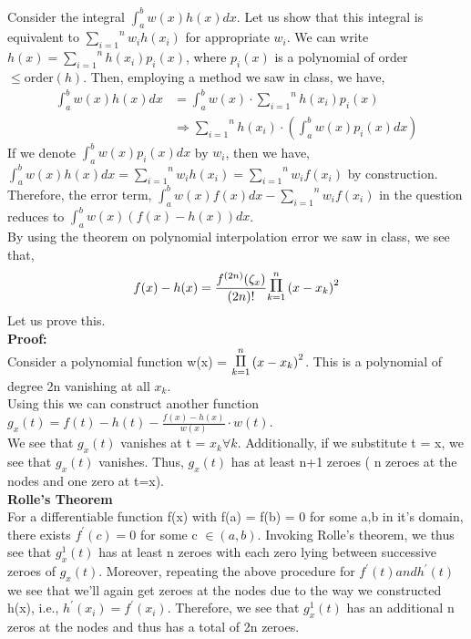 \documentclass[letterpaper]{exam}
\begin{document}
\begin{questions}
\begin{solution}
Consider the integral $\int_{a}^{b} w(x)h(x) dx$. Let us show that this integral is equivalent to $\overset{n}{\underset{i=1}{\sum}}w_ih(x_i)$ for appropriate $w_i$. We can write $h(x) = \overset{n}{\underset{i=1}{\sum}}h(x_i)p_i(x)$, where $p_i(x)$ is a polynomial of order $\leq \text{order}(h)$. Then, employing a method we saw in class, we have,
\begin{align*}
    \int_{a}^{b} w(x)h(x) dx &= \int_{a}^{b} w(x)\cdot \overset{n}{\underset{i=1}{\sum}}h(x_i)p_i(x)\\
    &\Rightarrow 
    \overset{n}{\underset{i=1}{\sum}}h(x_i)\cdot \left(\int_{a}^{b} w(x)p_i(x) dx\right) 
\end{align*}
If we denote $\int_{a}^{b} w(x)p_i(x) dx$ by $w_i$, then we have, $\int_{a}^{b} w(x)h(x) dx = \overset{n}{\underset{i=1}{\sum}}w_ih(x_i) = \overset{n}{\underset{i=1}{\sum}}w_if(x_i) $ by construction.
\\
Therefore, the error term, $\int_{a}^{b} w(x)f(x) dx - \overset{n}{\underset{i=1}{\sum}} w_if(x_i)$ in the question reduces to $\int_{a}^{b} w(x)\left(f(x) - h(x)\right) dx$.\\
By using the theorem on polynomial interpolation error we saw in class, we see that,
\begin{align}
    f(x) - h(x) = \frac{f^{(2n)}(\zeta_{x})}{(2n)!}\overset{n}{\underset{k = 1}{\mathlarger{\mathlarger{\Pi}}}}\left(x-x_k\right)^2
\end{align}
Let us prove this.
\\ \textbf{Proof:}\\
Consider a polynomial function w(x) = $\overset{n}{\underset{k = 1}{\mathlarger{\mathlarger{\Pi}}}}\left(x-x_k\right)^2$. This is a polynomial of degree 2n vanishing at all $x_k$.\\
Using this we can construct another function $g_x(t) = f(t) - h(t) - \frac{f(x)-h(x)}{w(x)}\cdot w(t)$.\\
We see that $g_x(t)$ vanishes at t = $x_k \forall k$. Additionally, if we substitute t = x, we see that $g_x(t)$ vanishes. Thus, $g_x(t)$ has at least n+1 zeroes ( n zeroes at the nodes and one zero at t=x).\\
\textbf{Rolle's Theorem}\\
For a differentiable function f(x) with f(a) = f(b) = 0 for some a,b in it's domain, there exists $f^{'}(c) = 0$ for some c $\in (a,b)$.
Invoking Rolle's theorem, we thus see that $g^{1}_x(t)$ has at least n zeroes with each zero lying between successive zeroes of $g_x(t)$. Moreover, repeating the above procedure for $f^{'}(t) and h^{'}(t)$ we see that we'll again get zeroes at the nodes due to the way we constructed h(x), i.e., $h^{'}(x_i) = f^{'}(x_i)$. Therefore, we see that $g^{1}_x(t)$ has an additional n zeros at the nodes and thus has a total of 2n zeroes.\\

\end{solution}
\end{questions}
\end{document}
